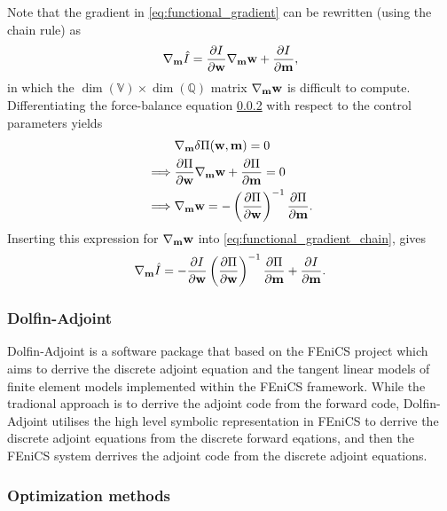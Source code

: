 Note that the gradient in
\eqref{eq:functional_gradient} can be rewritten (using the chain rule)
as
\begin{align}
  \nabla_{\mathbf{m}} \hat{I} =  \frac{\partial  I }{\partial \mathbf{w}} \nabla_{\mathbf{m}} \mathbf{w}
  + \frac{\partial  I }{\partial \mathbf{m}},
  \label{eq:functional_gradient_chain}
\end{align}
in which the $\dim(\mathbb{V}) \times \dim(\mathbb{Q})$ matrix
$\nabla_{\mathbf{m}} \mathbf{w}$ is difficult to compute.
Differentiating the force-balance equation \ref{} with respect to the
control parameters yields
\begin{align}
  & \nabla_{\mathbf{m}} \delta \Pi(\mathbf{w}, \mathbf{m}) = 0 \\
  \implies & \frac{\partial  \Pi }{\partial \mathbf{w}} \nabla_{\mathbf{m}} \mathbf{w}
  + \frac{\partial  \Pi }{\partial \mathbf{m}} = 0 \\
  \implies & \nabla_{\mathbf{m}} \mathbf{w} =
             - \left( \frac{\partial  \Pi }{\partial \mathbf{w}} \right)^{-1} \frac{\partial  \Pi }{\partial \mathbf{m}}.
\end{align}
Inserting this expression for $\nabla_{\mathbf{m}} \mathbf{w}$ into
\eqref{eq:functional_gradient_chain}, gives
\begin{align}
  \nabla_{\mathbf{m}} \hat{I} =  - \frac{\partial  I }{\partial \mathbf{w}}
  \left( \frac{\partial  \Pi }{\partial \mathbf{w}} \right)^{-1} \frac{\partial  \Pi }{\partial \mathbf{m}}
  + \frac{\partial  I }{\partial \mathbf{m}}.
\end{align}


\subsubsection{Dolfin-Adjoint}

Dolfin-Adjoint is a software package that based on the FEniCS project
which aims to derrive the discrete adjoint equation and the tangent
linear models of finite element models implemented within the FEniCS
framework. While the tradional approach is to derrive the adjoint code
from the forward code, Dolfin-Adjoint utilises the high level symbolic
representation \cite{UFL} in FEniCS to derrive the discrete adjoint equations
from the discrete forward eqations, and then the FEniCS system
derrives the adjoint code from the discrete adjoint equations.

\subsubsection{Optimization methods}



